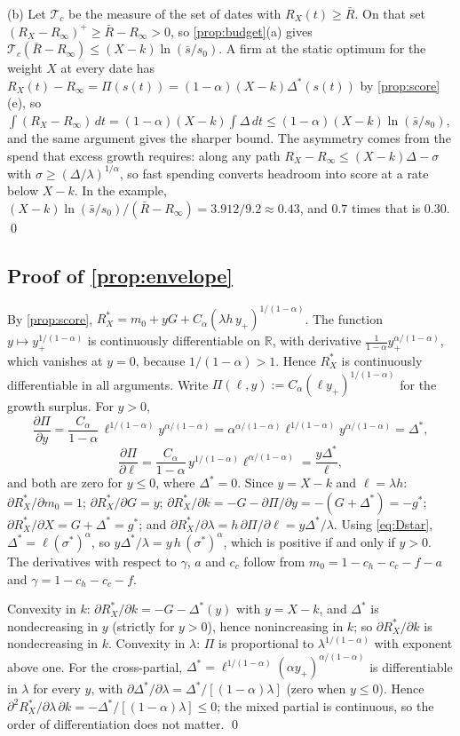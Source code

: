 (b) Let $\mathcal T_c$ be the measure of the set of dates with $R_X(t)\ge\bar R$. On that set $(R_X-R_\infty)^+\ge\bar R-R_\infty>0$, so \autoref{prop:budget}(a) gives $\mathcal T_c(\bar R-R_\infty)\le(X-k)\ln(\bar s/s_0)$. A firm at the static optimum for the weight $X$ at every date has $R_X(t)-R_\infty=\Pi(s(t))=(1-\alpha)(X-k)\Delta^*(s(t))$ by \autoref{prop:score}(e), so $\int(R_X-R_\infty)\,dt=(1-\alpha)(X-k)\int\Delta\,dt\le(1-\alpha)(X-k)\ln(\bar s/s_0)$, and the same argument gives the sharper bound. The asymmetry comes from the spend that excess growth requires: along any path $R_X-R_\infty\le(X-k)\Delta-\sigma$ with $\sigma\ge(\Delta/\lambda)^{1/\alpha}$, so fast spending converts headroom into score at a rate below $X-k$. In the example, $(X-k)\ln(\bar s/s_0)/(\bar R-R_\infty)=3.912/9.2\approx0.43$, and $0.7$ times that is $0.30$. \qed

\subsection*{Proof of \autoref{prop:envelope}}

By \autoref{prop:score}, $R_X^*=m_0+yG+C_\alpha(\lambda h\,y_+)^{1/(1-\alpha)}$. The function $y\mapsto y_+^{1/(1-\alpha)}$ is continuously differentiable on $\mathbb R$, with derivative $\frac{1}{1-\alpha}y_+^{\alpha/(1-\alpha)}$, which vanishes at $y=0$, because $1/(1-\alpha)>1$. Hence $R_X^*$ is continuously differentiable in all arguments. Write $\Pi(\ell,y):=C_\alpha(\ell y_+)^{1/(1-\alpha)}$ for the growth surplus. For $y>0$,
\[
\frac{\partial\Pi}{\partial y}=\frac{C_\alpha}{1-\alpha}\,\ell^{1/(1-\alpha)}y^{\alpha/(1-\alpha)}=\alpha^{\alpha/(1-\alpha)}\ell^{1/(1-\alpha)}y^{\alpha/(1-\alpha)}=\Delta^*,
\]
\[
\frac{\partial\Pi}{\partial\ell}=\frac{C_\alpha}{1-\alpha}\,y^{1/(1-\alpha)}\ell^{\alpha/(1-\alpha)}=\frac{y\Delta^*}{\ell},
\]
and both are zero for $y\le 0$, where $\Delta^*=0$. Since $y=X-k$ and $\ell=\lambda h$: $\partial R_X^*/\partial m_0=1$; $\partial R_X^*/\partial G=y$; $\partial R_X^*/\partial k=-G-\partial\Pi/\partial y=-(G+\Delta^*)=-g^*$; $\partial R_X^*/\partial X=G+\Delta^*=g^*$; and $\partial R_X^*/\partial\lambda=h\,\partial\Pi/\partial\ell=y\Delta^*/\lambda$. Using \eqref{eq:Dstar}, $\Delta^*=\ell(\sigma^*)^{\alpha}$, so $y\Delta^*/\lambda=y\,h\,(\sigma^*)^{\alpha}$, which is positive if and only if $y>0$. The derivatives with respect to $\gamma$, $a$ and $c_c$ follow from $m_0=1-c_h-c_c-f-a$ and $\gamma=1-c_h-c_c-f$.

Convexity in $k$: $\partial R_X^*/\partial k=-G-\Delta^*(y)$ with $y=X-k$, and $\Delta^*$ is nondecreasing in $y$ (strictly for $y>0$), hence nonincreasing in $k$; so $\partial R_X^*/\partial k$ is nondecreasing in $k$. Convexity in $\lambda$: $\Pi$ is proportional to $\lambda^{1/(1-\alpha)}$ with exponent above one. For the cross-partial, $\Delta^*=\ell^{1/(1-\alpha)}(\alpha y_+)^{\alpha/(1-\alpha)}$ is differentiable in $\lambda$ for every $y$, with $\partial\Delta^*/\partial\lambda=\Delta^*/[(1-\alpha)\lambda]$ (zero when $y\le 0$). Hence $\partial^2R_X^*/\partial\lambda\,\partial k=-\Delta^*/[(1-\alpha)\lambda]\le 0$; the mixed partial is continuous, so the order of differentiation does not matter. \qed

